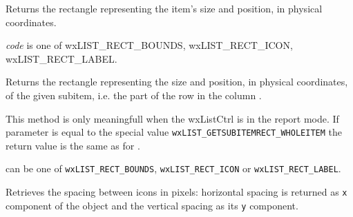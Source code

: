 


\label{wxlistctrlgetitemrect}


Returns the rectangle representing the item's size and position, in physical
coordinates.

{\it code} is one of wxLIST\_RECT\_BOUNDS, wxLIST\_RECT\_ICON, wxLIST\_RECT\_LABEL.





\label{wxlistctrlgetsubitemrect}


Returns the rectangle representing the size and position, in physical
coordinates, of the given subitem, i.e. the part of the row  in the
column .

This method is only meaningfull when the wxListCtrl is in the report mode. If
 parameter is equal to the special value 
\texttt{wxLIST\_GETSUBITEMRECT\_WHOLEITEM} the return value is the same as
for .

 can be one of \texttt{wxLIST\_RECT\_BOUNDS}, 
\texttt{wxLIST\_RECT\_ICON} or \texttt{wxLIST\_RECT\_LABEL}.



\label{wxlistctrlgetitemspacing}


Retrieves the spacing between icons in pixels: horizontal spacing is returned
as \texttt{x} component of the  object and the vertical
spacing as its \texttt{y} component.



